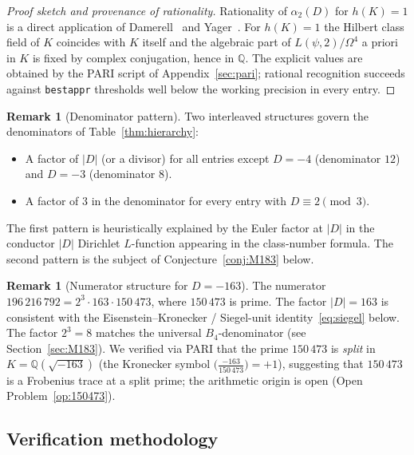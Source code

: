 \documentclass[12pt]{amsart}
\theoremstyle{definition}
\newtheorem{remark}[theorem]{Remark}
\newcommand{\Q}{\mathbb{Q}}
\begin{document}
\begin{proof}[Proof sketch and provenance of rationality]
Rationality of $\alpha_2(D)$ for $h(K)=1$ is a direct application of
Damerell~\cite{Damerell1971} and Yager~\cite{Yager1982}.
For $h(K)=1$ the Hilbert class field of $K$ coincides with $K$ itself
and the algebraic part of $L(\psi,2)/\Omega^4$ a priori in $K$ is
fixed by complex conjugation, hence in $\Q$. The explicit values are
obtained by the PARI script of Appendix~\ref{sec:pari}; rational
recognition succeeds against \texttt{bestappr} thresholds well below the
working precision in every entry.
\end{proof}

\begin{remark}[Denominator pattern]\label{rmk:denoms}
Two interleaved structures govern the denominators of
Table~\ref{thm:hierarchy}:
\begin{itemize}[leftmargin=2em]
  \item A factor of $|D|$ (or a divisor) for all entries except $D=-4$
        (denominator $12$) and $D=-3$ (denominator $8$).
  \item A factor of $3$ in the denominator for every entry with
        $D \equiv 2 \pmod 3$.
\end{itemize}
The first pattern is heuristically explained by the Euler factor at $|D|$
in the conductor $|D|$ Dirichlet $L$-function appearing in the
class-number formula. The second pattern is the subject of
Conjecture~\ref{conj:M183} below.
\end{remark}

\begin{remark}[Numerator structure for $D=-163$]\label{rmk:163num}
The numerator $196\,216\,792 = 2^3 \cdot 163 \cdot 150\,473$, where
$150\,473$ is prime. The factor $|D| = 163$ is consistent with the
Eisenstein--Kronecker / Siegel-unit identity~\eqref{eq:siegel} below.
The factor $2^3 = 8$ matches the universal $B_4$-denominator (see
Section~\ref{sec:M183}).
We verified via PARI that the prime $150\,473$ is \emph{split} in $K =
\Q(\sqrt{-163})$ (the Kronecker symbol $\bigl(\tfrac{-163}{150\,473}\bigr) = +1$),
suggesting that $150\,473$ is a Frobenius trace at a split prime; the
arithmetic origin is open (Open Problem~\ref{op:150473}).
\end{remark}

\subsection{Verification methodology}
\label{ssec:verification}
\end{document}
